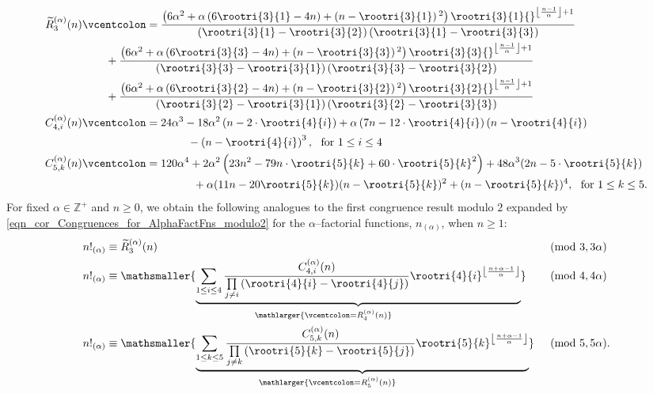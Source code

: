 \documentclass[12pt,reqno]{article}
\numberwithin{sfootnote}{section}
\numberwithin{equation}{section}
\theoremstyle{plain}
\theoremstyle{definition}
\theoremstyle{remark}
\newcommand{\defequals}{\ensuremath{\vcentcolon=}}
\newcommand{\undersetbrace}[2]{\ensuremath{\underset{\mathlarger{#1}}{\mathsmaller{\underbrace{#2}}}}}
\begin{document}
\begin{align*} 
\widetilde{R}_3^{(\alpha)}(n) & \defequals 
     \frac{\left(6 \alpha ^2+\alpha 
     \left(6 \rootri{3}{1}-4 n\right)+\left(n-\rootri{3}{1}
     \right){}^2\right) 
     \rootri{3}{1}{}^{\left\lfloor \frac{n-1}{\alpha }\right\rfloor+1}}{ 
     \left(\rootri{3}{1}-\rootri{3}{2}\right) 
     \left(\rootri{3}{1}-\rootri{3}{3}\right)} \\ 
   & \phantom{\equiv\ } \quad + 
     \frac{\left(6 \alpha ^2+\alpha  \left(6 \rootri{3}{3}-4 n\right)+ 
     \left(n-\rootri{3}{3}\right){}^2\right)
      \rootri{3}{3}{}^{\left\lfloor \frac{n-1}{\alpha }\right\rfloor +1}}{ 
      \left(\rootri{3}{3}-\rootri{3}{1}\right) 
      \left(\rootri{3}{3}-\rootri{3}{2}\right)} \\ 
   & \phantom{\equiv\ } \quad + 
     \frac{\left(6 \alpha ^2+\alpha \left(6 \rootri{3}{2}-4 n\right) + 
     \left(n-\rootri{3}{2}\right){}^2\right) \rootri{3}{2}{}^{\left\lfloor 
     \frac{n-1}{\alpha }\right\rfloor +1}}{ 
     \left(\rootri{3}{2}-\rootri{3}{1}\right)
     \left(\rootri{3}{2}-\rootri{3}{3}\right)} \\ 
C_{4,i}^{(\alpha)}(n) & \defequals 
     24 \alpha^3-18 \alpha ^2 \left(n-2 \cdot \rootri{4}{i} 
     \right)+\alpha  \left(7 n-12 \cdot \rootri{4}{i}\right) 
     \left(n-\rootri{4}{i}\right) \\ 
   & \phantom{\defequals 24 \alpha^3\ } - 
     \left(n-\rootri{4}{i}\right)^3,\ 
     \text{ for } 
     1 \leq i \leq 4 \\ 
C_{5,k}^{(\alpha)}(n) & \defequals 
     120 \alpha^4 + 2 \alpha^2 \left(23 n^2-79 n \cdot \rootri{5}{k} + 
     60 \cdot \rootri{5}{k}^2\right) + 
     48 \alpha ^3 (2n - 5 \cdot \rootri{5}{k}) \\ 
     & \phantom{\defequals 120 \alpha^4\ } + 
     \alpha  (11 n-20 \rootri{5}{k}) (n-\rootri{5}{k})^2 + 
     (n-\rootri{5}{k})^4,\ 
     \text{ for } 
     1 \leq k \leq 5. 
\end{align*} 
For fixed $\alpha \in \mathbb{Z}^{+}$ and $n \geq 0$, 
we obtain the following analogues to the first congruence result modulo $2$ 
expanded by \eqref{eqn_cor_Congruences_for_AlphaFactFns_modulo2} 
for the $\alpha$--factorial functions, $n_{(\alpha)}$, 
when $n \geq 1$: 
\begin{align} 
\label{eqn_AlphaFactFnModulo3_congruence_stmts} 
n!_{(\alpha)} & \equiv \widetilde{R}_3^{(\alpha)}(n) && \pmod{3, 3\alpha} \\ 
\notag 
n!_{(\alpha)} & \equiv 
     \undersetbrace{ \defequals R_4^{(\alpha)}(n)}{
     \sum\limits_{1 \leq i \leq 4} 
     \frac{C_{4,i}^{(\alpha)}(n)}{\prod\limits_{j \neq i} 
     \left(\rootri{4}{i} - \rootri{4}{j}\right)} 
     \rootri{4}{i}^{\left\lfloor \frac{n+\alpha-1}{\alpha} \right\rfloor} 
     } 
     && \pmod{4, 4\alpha} \\ 
\notag 
n!_{(\alpha)} & \equiv 
     \undersetbrace{ \defequals R_5^{(\alpha)}(n)}{ 
     \sum\limits_{1 \leq k \leq 5} 
     \frac{C_{5,k}^{(\alpha)}(n)}{\prod\limits_{j \neq k} 
     \left(\rootri{5}{k} - \rootri{5}{j}\right)} 
     \rootri{5}{k}^{\left\lfloor \frac{n+\alpha-1}{\alpha} \right\rfloor} 
     } 
     && \pmod{5, 5\alpha}. 
\end{align} 
\end{document}
